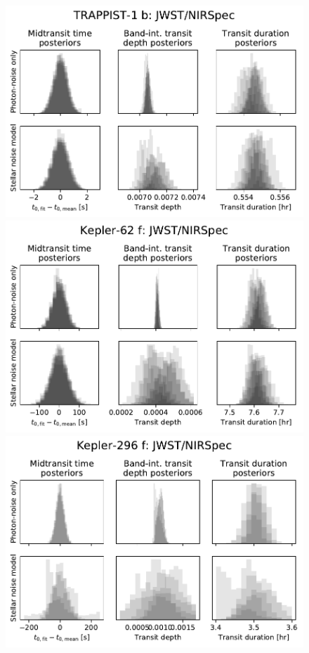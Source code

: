 \begin{figure}
\centering
\includegraphics[scale=0.55]{libra/photon_vs_stellar_noise_bandint_t1.pdf}
\includegraphics[scale=0.55]{libra/photon_vs_stellar_noise_bandint_k62.pdf}
\includegraphics[scale=0.55]{libra/photon_vs_stellar_noise_bandint_k296.pdf}

\end{figure}
